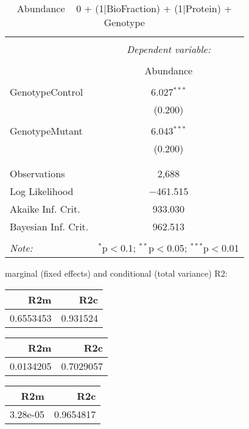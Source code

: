\documentclass[11pt]{report}
\begin{document}
\begin{table}[!htbp] \centering 
  \caption{Abundance ~ 0 + (1|BioFraction) + (1|Protein) + Genotype} 
  \label{} 
\begin{tabular}{@{\extracolsep{5pt}}lc} 
\\[-1.8ex]\hline 
\hline \\[-1.8ex] 
 & \multicolumn{1}{c}{\textit{Dependent variable:}} \\ 
\cline{2-2} 
\\[-1.8ex] & Abundance \\ 
\hline \\[-1.8ex] 
 GenotypeControl & 6.027$^{***}$ \\ 
  & (0.200) \\ 
  & \\ 
 GenotypeMutant & 6.043$^{***}$ \\ 
  & (0.200) \\ 
  & \\ 
\hline \\[-1.8ex] 
Observations & 2,688 \\ 
Log Likelihood & $-$461.515 \\ 
Akaike Inf. Crit. & 933.030 \\ 
Bayesian Inf. Crit. & 962.513 \\ 
\hline 
\hline \\[-1.8ex] 
\textit{Note:}  & \multicolumn{1}{r}{$^{*}$p$<$0.1; $^{**}$p$<$0.05; $^{***}$p$<$0.01} \\ 
\end{tabular} 
\end{table} 
marginal (fixed effects) and conditional (total variance) R2:

\begin{tabular}{r|r}
\hline
R2m & R2c\\
\hline
0.6553453 & 0.931524\\
\hline
\end{tabular}

\begin{tabular}{r|r}
\hline
R2m & R2c\\
\hline
0.0134205 & 0.7029057\\
\hline
\end{tabular}

\begin{tabular}{r|r}
\hline
R2m & R2c\\
\hline
3.28e-05 & 0.9654817\\
\hline
\end{tabular}
\end{document}
